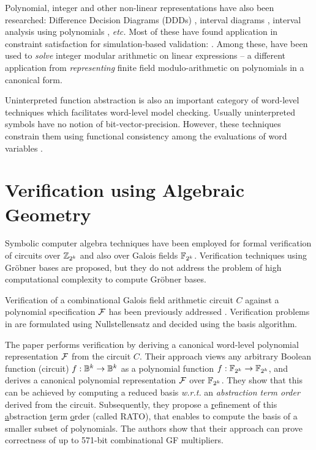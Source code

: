Polynomial, integer and other non-linear representations have also
been researched: Difference Decision Diagrams (DDDs) \cite{ddd-csl99,ddd-mt-98}, interval
diagrams \cite{interval_dd}, interval analysis using polynomials
\cite{polynomial_sanchez99}, {\it etc.} Most of these have found 
application in constraint satisfaction for simulation-based
validation:  \cite{Ritter99,hsat,lpsat,brinkmann:asp-dac,Huang:tcad01,bitvector98}. Among
these, \cite{brinkmann:asp-dac,Huang:tcad01,bitvector98}
have been used to {\it solve} integer modular arithmetic on linear
expressions -- a different application from {\it representing}
finite field modulo-arithmetic on polynomials in a canonical form.   

Uninterpreted function abstraction is also an important category of 
word-level techniques which facilitates word-level model checking.
Usually uninterpreted symbols have no notion of bit-vector-precision. However, these techniques
constrain them 
using functional consistency among the evaluations of word variables
\cite{UF1,UF2,UF3}.


\section{Verification using Algebraic Geometry}

Symbolic computer algebra techniques have been employed for formal
verification of circuits over ${\mathbb{Z}}_{2^k}$ and also over
Galois fields ${\mathbb{F}}_{2^k}$. 
Verification techniques using Gr\"obner bases
\cite{Avrunin:CAV,gbverify:2007,manna:program} are proposed,
but they do not address the problem of high computational complexity to
compute Gr\"obner bases.

Verification of a combinational Galois field arithmetic circuit $C$ against a
polynomial specification ${\mathcal{F}}$ has been previously addressed 
\cite{ibm:blueveri,lv:tcad2013,pruss:dac14}. Verification problems in
\cite{ibm:blueveri,lv:tcad2013} are formulated using
Nullstellensatz and decided using the \Grobner basis algorithm.

The paper 
\cite{pruss:dac14} performs verification by deriving a canonical
word-level polynomial representation ${\mathcal{F}}$ from the circuit $C$. Their
approach views any arbitrary Boolean function (circuit) $f: {\mathbb{B}}^k
\rightarrow {\mathbb{B}}^k$ as a polynomial function $f: {\mathbb{F}}_{2^k} \rightarrow {\mathbb{F}}_{2^k}$,
and derives a canonical polynomial representation ${\mathcal{F}}$ over
${\mathbb{F}}_{2^k}$. They show that this can be achieved by computing a reduced 
\Grobner basis {\it w.r.t.} an {\it abstraction term order} derived from the
circuit. Subsequently, they propose a \underline{r}efinement of this
\underline{a}bstraction \underline{t}erm \underline{o}rder (called
RATO), that enables to compute the \Grobner basis of a smaller subset
of polynomials. The authors show that their approach can prove
correctness of up to 571-bit combinational GF multipliers. 

